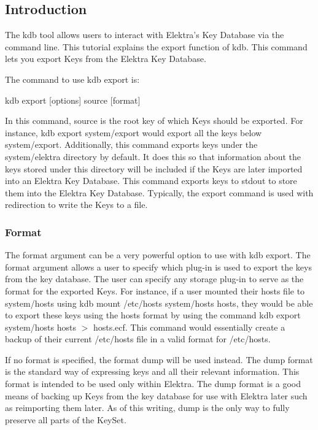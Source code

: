 \subsection*{Introduction}

The kdb tool allows users to interact with Elektra’s Key Database via the command line. This tutorial explains the export function of kdb. This command lets you export Keys from the Elektra Key Database.

The command to use kdb export is\+:


\begin{DoxyCode}
kdb export [options] source [format]
\end{DoxyCode}


In this command, source is the root key of which Keys should be exported. For instance, {\ttfamily kdb export system/export} would export all the keys below {\ttfamily system/export}. Additionally, this command exports keys under the {\ttfamily system/elektra} directory by default. It does this so that information about the keys stored under this directory will be included if the Keys are later imported into an Elektra Key Database. This command exports keys to {\ttfamily stdout} to store them into the Elektra Key Database. Typically, the export command is used with redirection to write the Keys to a file.

\subsubsection*{Format}

The format argument can be a very powerful option to use with kdb export. The format argument allows a user to specify which plug-\/in is used to export the keys from the key database. The user can specify any storage plug-\/in to serve as the format for the exported Keys. For instance, if a user mounted their hosts file to {\ttfamily system/hosts} using {\ttfamily kdb mount /etc/hosts system/hosts hosts}, they would be able to export these keys using the hosts format by using the command {\ttfamily kdb export system/hosts hosts $>$ hosts.\+ecf}. This command would essentially create a backup of their current {\ttfamily /etc/hosts} file in a valid format for {\ttfamily /etc/hosts}.

If no format is specified, the format {\ttfamily dump} will be used instead. The dump format is the standard way of expressing keys and all their relevant information. This format is intended to be used only within Elektra. The dump format is a good means of backing up Keys from the key database for use with Elektra later such as reimporting them later. As of this writing, {\ttfamily dump} is the only way to fully preserve all parts of the {\ttfamily Key\+Set}.

